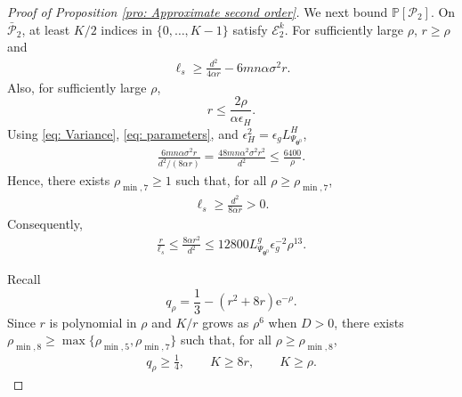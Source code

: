 \documentclass{siamart251216}
\begin{document}
\begin{proof}[Proof of Proposition \ref{pro: Approximate second order}]
    We next bound $\mathbb{P}[\mathcal{P}_{2}]$. On $\bar{\mathcal{P}}_{2}$, at least $K/2$ indices in $\{0,\ldots,K-1\}$ satisfy $\mathcal{E}_{2}^{k}$. For sufficiently large $\rho$, $r\geq\rho$ and
    \begin{gather*}
        \ell_s
        \geq
        \frac{d^{2}}{4\alpha r}-6mn\alpha\sigma^{2}r.
    \end{gather*}
    Also, for sufficiently large $\rho$,
    \[
        r\leq\frac{2\rho}{\alpha\epsilon_H}.
    \]
    Using \eqref{eq: Variance}, \eqref{eq: parameters}, and $\epsilon_H^{2}=\epsilon_gL_{\Psi_{\boldsymbol{\theta}^{0}}}^{H}$,
    \begin{gather*}
        \frac{6mn\alpha\sigma^{2}r}{d^{2}/(8\alpha r)}
        =
        \frac{48mn\alpha^{2}\sigma^{2}r^{2}}{d^{2}}
        \leq\frac{6400}{\rho}.
    \end{gather*}
    Hence, there exists $\rho_{\min,7}\geq1$ such that, for all $\rho\geq\rho_{\min,7}$,
    \begin{gather}
        \label{eq: ls lower bound}
        \ell_s\geq\frac{d^{2}}{8\alpha r}>0.
    \end{gather}
    Consequently,
    \begin{gather}
        \label{eq: r/ls}
        \frac{r}{\ell_s}
        \leq\frac{8\alpha r^{2}}{d^{2}}
        \leq12800L_{\Psi_{\boldsymbol{\theta}^{0}}}^{g}\epsilon_g^{-2}\rho^{13}.
    \end{gather}

    Recall
    \[
        q_{\rho}=\frac13-(r^{2}+8r)\mathrm{e}^{-\rho}.
    \]
    Since $r$ is polynomial in $\rho$ and $K/r$ grows as $\rho^{6}$ when $D>0$, there exists $\rho_{\min,8}\geq\max\{\rho_{\min,5},\rho_{\min,7}\}$ such that, for all $\rho\geq\rho_{\min,8}$,
    \begin{gather}
        \label{eq: large rho block conditions}
        q_{\rho}\geq\frac14,\qquad K\geq8r,\qquad K\geq\rho.
    \end{gather}


\end{proof}
\end{document}
